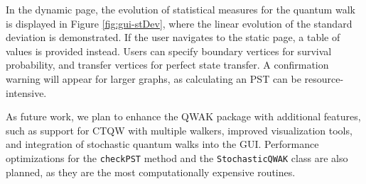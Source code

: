 \documentclass[../../dissertation.tex]{subfiles}
\begin{document}
In the dynamic page, the evolution of statistical measures for the quantum walk
is displayed in Figure \ref{fig:gui-stDev}, where the linear evolution of the
standard deviation is demonstrated. If the user navigates to the static page, a
table of values is provided instead. Users can specify boundary vertices for
survival probability, and transfer vertices for perfect state transfer. A
confirmation warning will appear for larger graphs, as calculating an PST can
be resource-intensive.

As future work, we plan to enhance the QWAK package with additional features,
such as support for CTQW with multiple walkers, improved visualization tools,
and integration of stochastic quantum walks into the GUI. Performance
optimizations for the \texttt{checkPST} method and the \texttt{StochasticQWAK}
class are also planned, as they are the most computationally expensive routines.

\end{document}
